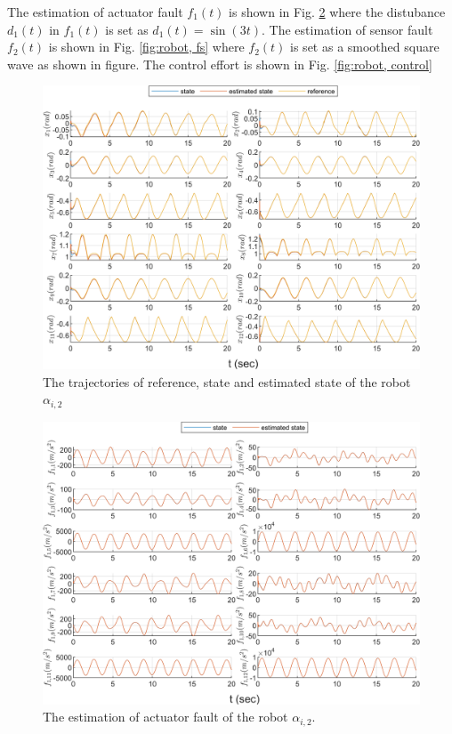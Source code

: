 \documentclass{ieeeaccess}
\begin{document}
The estimation of actuator fault $f_1(t)$ is shown in Fig. \ref{fig:robot, fa} where the distubance $d_1(t)$ in $f_1(t)$ is set as $d_1(t)=\sin(3t)$. The estimation of sensor fault $f_2(t)$ is shown in Fig. \ref{fig:robot, fs} where $f_2(t)$ is set as a smoothed square wave as shown in figure. The control effort is shown in Fig. \ref{fig:robot, control}
\begin{figure}[htbp]
    \centering
    \includegraphics[scale=.57]{fig/robot (1).png}\caption{The trajectories of reference, state and estimated state of the robot $\alpha_{i,2}$}%
    \label{fig:robot, state}
\end{figure}
\begin{figure}[htbp]
    \centering
    \includegraphics[scale=.57]{fig/robot (2).png}\caption{The estimation of actuator fault of the robot $\alpha_{i,2}$.}%
    \label{fig:robot, fa}
\end{figure}
\end{document}
